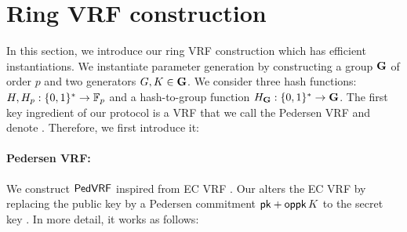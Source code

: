 \section{Ring VRF construction}%
\label{sec:pederson_vrf}

In this section, we introduce our ring VRF construction which has efficient instantiations. 
We instantiate parameter generation by constructing a group ${\mathbf{G}}$ of order $ p $ and two generators $ G, K \in  {\mathbf{G}}$.  We consider three hash functions: $ H, H_p: \{0,1\}^* \rightarrow \mathbb{F}_p $ and a hash-to-group function $H_{{\mathbf{G}}} : \{0,1\}^* \rightarrow {\mathbf{G}}$.
The first key ingredient of our protocol is a VRF that we  call the Pedersen VRF and denote \PedVRF. Therefore, we first introduce it:

\paragraph{Pedersen VRF:} We construct $ {\mathsf{PedVRF}} $ inspired from EC VRF  \cite{nsec5,VXEd25519,draft-irtf-cfrg-vrf-10}.
%
Our \PedVRF alters the EC VRF by replacing the public key by
a Pedersen commitment $\mathsf{pk} + \mathsf{oppk} \, K$ to the secret key \sk.  In more detail, it works as follows:


%

